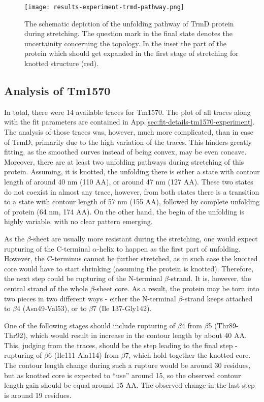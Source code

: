 \begin{figure}
    \centering
    \texttt{[image: results-experiment-trmd-pathway.png]}
    \caption{The schematic depiction of the unfolding pathway of TrmD protein during stretching. The question mark in the final state denotes the uncertainity concerning the topology. In the inset the part of the protein which should get expanded in the first stage of stretching for knotted structure (red).}
    \label{fig:results-experiment-trmd-pathway}
\end{figure}



\subsection{Analysis of Tm1570}
\label{subsec:results-experiment-tm1570}
In total, there were 14 available traces for Tm1570\@.
The plot of all traces along with the fit parameters are contained in App.\ref{sec:fit-details-tm1570-experiment}.
The analysis of those traces was, however, much more complicated, than in case of TrmD, primarily due to the high variation of the traces.
This hinders greatly fitting, as the smoothed curves instead of being convex, may be even concave.
Moreover, there are at least two unfolding pathways during stretching of this protein.
Assuming, it is knotted, the unfolding there is either a state with contour length of around 40 nm (110 AA), or around 47 nm (127 AA).
These two states do not coexist in almost any trace, however, from both states there is a transition to a state with contour length of 57 nm (155 AA), followed by complete unfolding of protein (64 nm, 174 AA).
On the other hand, the begin of the unfolding is highly variable, with no clear pattern emerging.

As the $\beta$-sheet are usually more resistant during the stretching, one would expect rupturing of the C-terminal $\alpha$-helix to happen as the first part of unfolding.
However, the C-terminus cannot be further stretched, as in such case the knotted core would have to start shrinking (assuming the protein is knotted).
Therefore, the next step could be rupturing of the N-terminal $\beta$-strand.
It is, however, the central strand of the whole $\beta$-sheet core.
As a result, the protein may be torn into two pieces in two different ways - either the N-terminal $\beta$-strand keeps attached to $\beta$4 (Asn49-Val53), or to $\beta$7 (Ile 137-Gly142).

One of the following stages should include rupturing of $\beta$4 from $\beta$5 (Thr89-Thr92), which would result in increase in the contour length by about 40 AA\@.
This, judging from the traces, should be the step leading to the final step - rupturing of $\beta$6 (Ile111-Ala114) from $\beta$7, which hold together the knotted core.
The contour length change during such a rupture would be around 30 residues, but as knotted core is expected to ``use'' around 15, so the observed contour length gain should be equal around 15 AA\@.
The observed change in the last step is around 19 residues.

